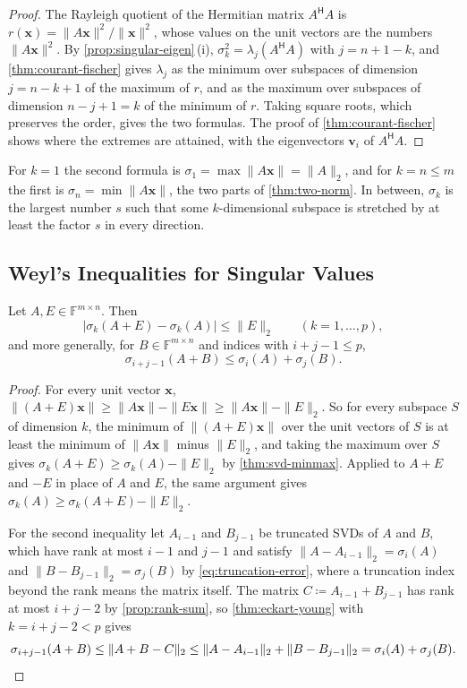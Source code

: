 \begin{proof}
The Rayleigh quotient of the Hermitian matrix $A^{\mathsf H}A$ is $r(\mathbf x)=\|A\mathbf x\|^2/\|\mathbf x\|^2$, whose values on the unit vectors are the numbers $\|A\mathbf x\|^2$. By \cref{prop:singular-eigen}\,(i), $\sigma_k^2=\lambda_j(A^{\mathsf H}A)$ with $j=n+1-k$, and \cref{thm:courant-fischer} gives $\lambda_j$ as the minimum over subspaces of dimension $j=n-k+1$ of the maximum of $r$, and as the maximum over subspaces of dimension $n-j+1=k$ of the minimum of $r$. Taking square roots, which preserves the order, gives the two formulas. The proof of \cref{thm:courant-fischer} shows where the extremes are attained, with the eigenvectors $\mathbf v_i$ of $A^{\mathsf H}A$.
\end{proof}

For $k=1$ the second formula is $\sigma_1=\max\|A\mathbf x\|=\|A\|_2$, and for $k=n\le m$ the first is $\sigma_n=\min\|A\mathbf x\|$, the two parts of \cref{thm:two-norm}. In between, $\sigma_k$ is the largest number $s$ such that some $k$-dimensional subspace is stretched by at least the factor $s$ in every direction.

\subsection{Weyl's Inequalities for Singular Values}

\begin{theorem}
\label{thm:weyl-singular}
Let $A,E\in\mathbb F^{m\times n}$. Then
\[
|\sigma_k(A+E)-\sigma_k(A)|\le\|E\|_2\qquad(k=1,\ldots,p),
\]
and more generally, for $B\in\mathbb F^{m\times n}$ and indices with $i+j-1\le p$,
\[
\sigma_{i+j-1}(A+B)\le\sigma_i(A)+\sigma_j(B).
\]
\end{theorem}

\begin{proof}
For every unit vector $\mathbf x$, $\|(A+E)\mathbf x\|\ge\|A\mathbf x\|-\|E\mathbf x\|\ge\|A\mathbf x\|-\|E\|_2$. So for every subspace $S$ of dimension $k$, the minimum of $\|(A+E)\mathbf x\|$ over the unit vectors of $S$ is at least the minimum of $\|A\mathbf x\|$ minus $\|E\|_2$, and taking the maximum over $S$ gives $\sigma_k(A+E)\ge\sigma_k(A)-\|E\|_2$ by \cref{thm:svd-minmax}. Applied to $A+E$ and $-E$ in place of $A$ and $E$, the same argument gives $\sigma_k(A)\ge\sigma_k(A+E)-\|E\|_2$.

For the second inequality let $A_{i-1}$ and $B_{j-1}$ be truncated SVDs of $A$ and $B$, which have rank at most $i-1$ and $j-1$ and satisfy $\|A-A_{i-1}\|_2=\sigma_i(A)$ and $\|B-B_{j-1}\|_2=\sigma_j(B)$ by \eqref{eq:truncation-error}, where a truncation index beyond the rank means the matrix itself. The matrix $C\coloneqq A_{i-1}+B_{j-1}$ has rank at most $i+j-2$ by \cref{prop:rank-sum}, so \cref{thm:eckart-young} with $k=i+j-2<p$ gives
\[
\sigma_{i+j-1}(A+B)\le\|A+B-C\|_2\le\|A-A_{i-1}\|_2+\|B-B_{j-1}\|_2=\sigma_i(A)+\sigma_j(B).\qedhere
\]
\end{proof}

